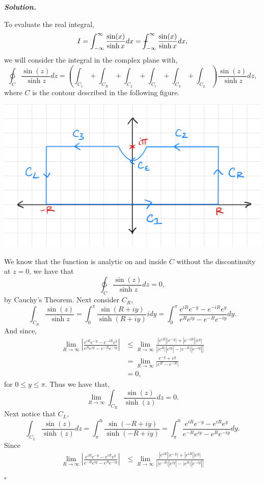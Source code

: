 \documentclass[12pt]{report}
\newenvironment{solution}[1][\it{Solution}]{\textbf{#1. } }{$\square$}
\newcommand{\paren}[1]{{\left(#1\right)}} %
\newcommand{\abs}[1]{{\left|#1\right|}} %
\def\Xint#1{\mathchoice
   {\XXint\displaystyle\textstyle{#1}}%
   {\XXint\textstyle\scriptstyle{#1}}%
   {\XXint\scriptstyle\scriptscriptstyle{#1}}%
   {\XXint\scriptscriptstyle\scriptscriptstyle{#1}}%
   \!\int}
\def\XXint#1#2#3{{\setbox0=\hbox{$#1{#2#3}{\int}$}
     \vcenter{\hbox{$#2#3$}}\kern-.5\wd0}}
\def\dashint{\Xint-}
\def\ointcc{{\ointctrclockwise}}
\begin{document}
\begin{solution}
    
    \noindent
    To evaluate the real integral,
    \[
        I = \int_{-\infty}^{\infty} \frac{\sin(x)}{\sinh{x}} dx = \dashint_{-\infty}^{\infty} \frac{\sin(x)}{\sinh{x}} dx,
    \]
    we will consider the integral in the complex plane with,
    \[
        \ointcc_C \frac{\sin(z)}{\sinh{z}} dz = \paren{\int_{C_1} + \int_{C_R} + \int_{C_2} + \int_{C_\epsilon} + \int_{C_3} + \int_{C_L}}\frac{\sin(z)}{\sinh{z}} dz,
    \]
    where $C$ is the contour described in the following figure.
    \begin{center}
        \includegraphics[width=.5\textwidth]{fig1.png}
    \end{center}
    We know that the function is analytic on and inside $C$ without the discontinuity at $z = 0$, we have that 
    \[ 
        \ointcc_C \frac{\sin(z)}{\sinh{z}} dz = 0,
    \]
    by Cauchy's Theorem. Next consider $C_R$,
    \[ 
        \int_{C_R} \frac{\sin(z)}{\sinh{z}} = \int_{0}^{\pi} \frac{\sin(R + iy)}{\sinh{(R + iy)}}idy = \int_{0}^{\pi} \frac{e^{iR}e^{-y} - e^{-iR}e^{y}}{e^Re^{iy} - e^{-R}e^{-iy}}dy.
    \]
    And since,
    \begin{align*}
        \lim_{R \rightarrow \infty} \abs{\frac{e^{iR}e^{-y} - e^{-iR}e^{y}}{e^Re^{iy} - e^{-R}e^{-iy}}} 
        &\leq \lim_{R \rightarrow \infty} \frac{\abs{e^{iR}}\abs{e^{-y}} + \abs{e^{-iR}}\abs{e^{y}}}{\abs{\abs{e^R}\abs{e^{iy}} - \abs{e^{-R}}\abs{e^{-iy}}}}\\
        &= \lim_{R \to \infty} \frac{e^{-y} + e^y}{\abs{e^R - e^{-R}}}\\
        &= 0,
    \end{align*}
    for $0\leq y \leq \pi$. Thus we have that,
    \[ 
        \lim_{R \to \infty} \int_{C_R} \frac{\sin(z)}{\sinh(z)}dz = 0.
    \]
    Next notice that $C_L$,
    \[ 
        \int_{C_L} \frac{\sin(z)}{\sinh(z)}dz = \int_{\pi}^{0} \frac{\sin(-R + iy)}{\sinh(-R + iy)} = \int_{\pi}^{0} \frac{e^{iR}e^{-y} - e^{iR}e^{y}}{e^{-R}e^{iy} - e^{R}e^{-iy}}dy.
    \]
    Since
    \begin{align*}
        \lim_{R \to \infty} \abs{\frac{e^{iR}e^{-y} - e^{iR}e^{y}}{e^{-R}e^{iy} - e^{R}e^{-iy}} } &\leq \lim_{R \to \infty} \frac{\abs{e^{iR}}\abs{e^{-y}} + \abs{e^{iR}}\abs{e^{y}}}{\abs{\abs{e^{-R}}\abs{e^{iy}} - \abs{e^{R}}\abs{e^{-iy}}}}\\

\end{align*}
\end{solution}
\end{document}

